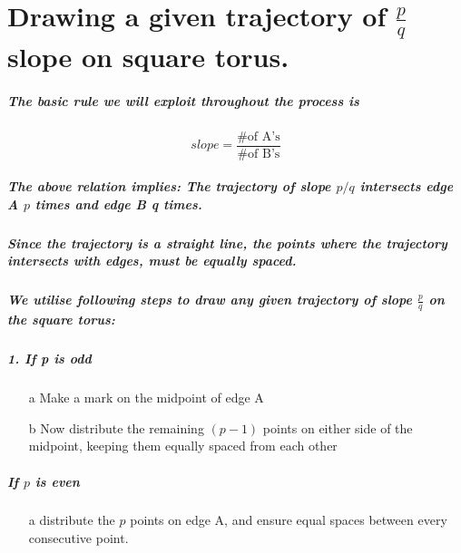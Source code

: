 \documentclass{report}
\begin{document}
\chapter{Drawing a given trajectory of $\frac{p}{q}$ slope on square torus.}


\paragraph{The basic rule we will exploit throughout the process is}

\begin{displaymath}
slope=\frac{\text{\# of A's}}{\text{\# of B's}}
\end{displaymath}

\paragraph{The above relation implies: The trajectory of slope $p/q$ intersects edge A $p$ times and edge B q times.}

\paragraph{Since the trajectory is a straight line, the points where the trajectory intersects with edges, must be equally spaced.}

\paragraph{We utilise following steps to draw any given trajectory of slope $\frac{p}{q}$ on the square torus:}

\paragraph{1. If p is odd}

\begin{enumerate}
\item[a]  {Make a mark on the midpoint of edge A}

\item[b]  {Now distribute the remaining $(p-1)$ points on either side of the midpoint, keeping them equally spaced from each other}
\end{enumerate}

\paragraph{\quad If $p$ is even}
\begin{enumerate}
\item[a]  {distribute the $p$ points on edge A, and ensure equal spaces between every consecutive point.}
\end{enumerate}
\end{document}
